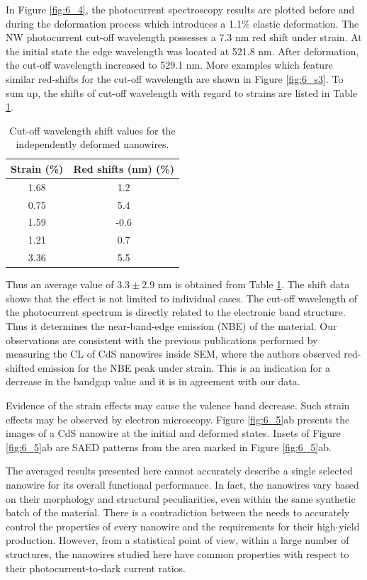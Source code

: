 In Figure \ref{fig:6_4}, the photocurrent spectroscopy results are plotted before and during the deformation process which introduces a 1.1\% elastic deformation.
The NW photocurrent cut-off wavelength possesses a 7.3 nm red shift under strain. At the initial state the edge wavelength was located at 521.8 nm. After deformation, the cut-off wavelength increased to 529.1 nm. 
More examples which feature similar red-shifts for the cut-off wavelength are shown in Figure \ref{fig:6_s3}. 
To sum up, the shifts of cut-off wavelength with regard to strains are listed in Table \ref{tab:6_1}. 

\begin{table}[b]
    \centering
    \begin{tabular}{c|c}
    \hline
         Strain (\%) & Red shifts (nm) (\%)\\
         \hline
         1.68 & 1.2\\
         0.75 & 5.4\\
         1.59 & -0.6\\
         1.21 & 0.7\\
         3.36 & 5.5\\
         \hline
    \end{tabular}
    \caption{Cut-off wavelength shift values for the independently deformed nanowires.}
    \label{tab:6_1}
\end{table}

Thus an average value of $3.3\pm2.9$ nm is obtained from Table \ref{tab:6_1}. The shift data shows that the effect is not limited to individual cases. 
The cut-off wavelength of the photocurrent spectrum is directly related to the electronic band structure. Thus it determines the near-band-edge emission (NBE) of the material. 
Our observations are consistent with the previous publications performed by measuring the CL of CdS nanowires inside SEM, where the authors observed red-shifted emission for the NBE peak under strain. 
This is an indication for a decrease in the bandgap value and it is in agreement with our data.\cite{Fu2011}

Evidence of the strain effects may cause the valence band decrease. Such strain effects may be observed by electron microscopy. 
Figure \ref{fig:6_5}ab presents the images of a CdS nanowire at the initial and deformed states. 
Insets of Figure \ref{fig:6_5}ab are SAED patterns from the area marked in Figure \ref{fig:6_5}ab. 

The averaged results presented here cannot accurately describe a single selected nanowire for its overall functional performance. 
In fact, the nanowires vary based on their morphology and structural peculiarities, even within the same synthetic batch of the material. 
There is a contradiction between the needs to accurately control the properties of every nanowire and the requirements for their high-yield production. However, from a statistical point of view, within a large number of structures, the nanowires studied here have common properties with respect to their photocurrent-to-dark current ratios. 



